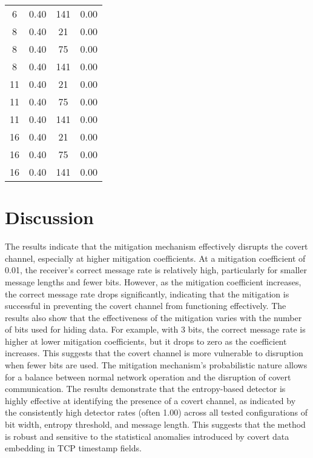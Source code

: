 \documentclass[10pt,a4paper]{article}
\begin{document}
\begin{center}
\begin{longtable}{cccc}
6  & 0.40 & 141 & 0.00 \\
8  & 0.40 & 21  & 0.00 \\
8  & 0.40 & 75  & 0.00 \\
8  & 0.40 & 141 & 0.00 \\
11 & 0.40 & 21  & 0.00 \\
11 & 0.40 & 75  & 0.00 \\
11 & 0.40 & 141 & 0.00 \\
16 & 0.40 & 21  & 0.00 \\
16 & 0.40 & 75  & 0.00 \\
16 & 0.40 & 141 & 0.00 \\
\end{longtable}
\end{center}



\section*{Discussion}
The results indicate that the mitigation mechanism effectively disrupts the covert channel, especially at higher mitigation coefficients.
At a mitigation coefficient of 0.01, the receiver's correct message rate is relatively high, particularly for smaller message lengths and fewer bits.
 However, as the mitigation coefficient increases, the correct message rate drops significantly, indicating that the mitigation is successful in preventing the covert channel from functioning effectively.
The results also show that the effectiveness of the mitigation varies with the number of bits used for hiding data.
 For example, with 3 bits, the correct message rate is higher at lower mitigation coefficients, but it drops to zero as the coefficient increases. 
 This suggests that the covert channel is more vulnerable to disruption when fewer bits are used.
The mitigation mechanism's probabilistic nature allows for a balance between normal network operation and the disruption of covert communication.
The results demonstrate that the entropy-based detector is highly effective at identifying the presence of a covert channel, as indicated by the consistently high detector rates (often 1.00) across all tested configurations of bit width, entropy threshold, and message length.
 This suggests that the method is robust and sensitive to the statistical anomalies introduced by covert data embedding in TCP timestamp fields.
\end{document}
